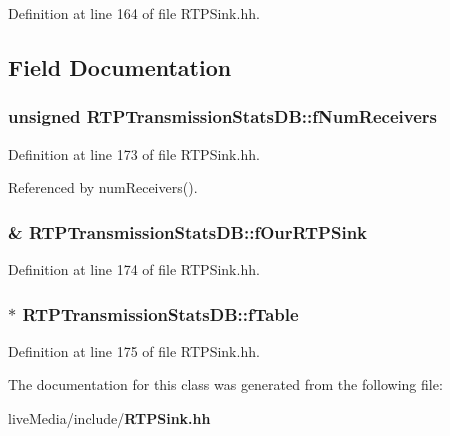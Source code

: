 Definition at line 164 of file R\+T\+P\+Sink.\+hh.



\subsection{Field Documentation}
\subsubsection[{f\+Num\+Receivers}]{\setlength{\rightskip}{0pt plus 5cm}unsigned R\+T\+P\+Transmission\+Stats\+D\+B\+::f\+Num\+Receivers\hspace{0.3cm}{\ttfamily [private]}}\label{classRTPTransmissionStatsDB_a8b61d7864e72bb2fd3b92bc610456f06}


Definition at line 173 of file R\+T\+P\+Sink.\+hh.



Referenced by num\+Receivers().

\subsubsection[{f\+Our\+R\+T\+P\+Sink}]{\& R\+T\+P\+Transmission\+Stats\+D\+B\+::f\+Our\+R\+T\+P\+Sink\hspace{0.3cm}{\ttfamily [private]}}\label{classRTPTransmissionStatsDB_a6097b8a9e9962d6abc2e3c28733c71b8}


Definition at line 174 of file R\+T\+P\+Sink.\+hh.

\subsubsection[{f\+Table}]{$\ast$ R\+T\+P\+Transmission\+Stats\+D\+B\+::f\+Table\hspace{0.3cm}{\ttfamily [private]}}\label{classRTPTransmissionStatsDB_a098a40918bdfdf82337cfca577006c9f}


Definition at line 175 of file R\+T\+P\+Sink.\+hh.



The documentation for this class was generated from the following file\+:\begin{DoxyCompactItemize}
\item 
live\+Media/include/{\bf R\+T\+P\+Sink.\+hh}\end{DoxyCompactItemize}
